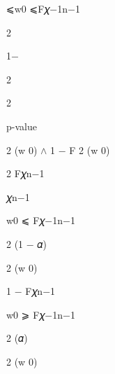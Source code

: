 \documentclass[a4paper,portrait,12pt]{article}
\begin{document}
\begin{flushleft}
⩽w0 ⩽F𝜒$-$1n$-$1
\end{flushleft}


2


1$-$


2


2





\begin{flushleft}
p-value
\end{flushleft}


\begin{flushleft}
2 (w 0) $\land$ 1 $-$ F 2 (w 0)
\end{flushleft}


\begin{flushleft}
2 F𝜒n$-$1
\end{flushleft}


\begin{flushleft}
𝜒n$-$1
\end{flushleft}





\begin{flushleft}
w0 ⩽ F𝜒$-$1n$-$1
\end{flushleft}


\begin{flushleft}
2 (1 $-$ 𝛼)
\end{flushleft}





\begin{flushleft}
2 (w 0)
\end{flushleft}


\begin{flushleft}
1 $-$ F𝜒n$-$1
\end{flushleft}





\begin{flushleft}
w0 ⩾ F𝜒$-$1n$-$1
\end{flushleft}


\begin{flushleft}
2 (𝛼)
\end{flushleft}





\begin{flushleft}
2 (w 0)
\end{flushleft}
\end{document}
